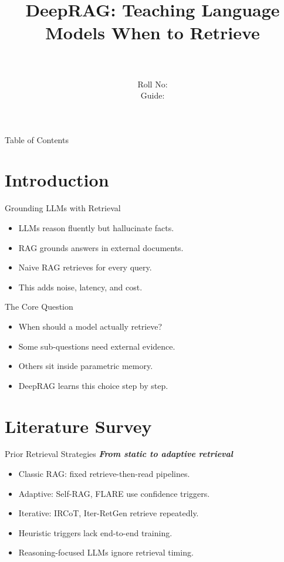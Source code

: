 \documentclass{beamer}
\title[\seminarShortTitle]{DeepRAG: Teaching Language Models When to Retrieve}
\author[\seminarName\ (\seminarShortCollege)]{\seminarName \\ \seminarRoll \\ Roll No: \seminarClassRoll \\ Guide: \seminarGuide}
\institute[\seminarShortCollege]{\seminarDept \\ \seminarCollege}
\date{\seminarDate}
\begin{document}
\begin{frame}\titlepage\end{frame}
\begin{frame}{Table of Contents}\tableofcontents\end{frame}
\section{Introduction}
\begin{frame}{Grounding LLMs with Retrieval}
\begin{itemize}
\item LLMs reason fluently but hallucinate facts.
\item RAG grounds answers in external documents.
\item Naive RAG retrieves for every query.
\item This adds noise, latency, and cost.
\end{itemize}
\end{frame}

\begin{frame}{The Core Question}
\begin{itemize}
\item When should a model actually retrieve?
\item Some sub-questions need external evidence.
\item Others sit inside parametric memory.
\item DeepRAG learns this choice step by step.
\end{itemize}
\end{frame}

\section{Literature Survey}
\begin{frame}{Prior Retrieval Strategies}
\textbf{\textit{From static to adaptive retrieval}}
\begin{itemize}
\item Classic RAG: fixed retrieve-then-read pipelines.
\item Adaptive: Self-RAG, FLARE use confidence triggers.
\item Iterative: IRCoT, Iter-RetGen retrieve repeatedly.
\item Heuristic triggers lack end-to-end training.
\item Reasoning-focused LLMs ignore retrieval timing.
\end{itemize}
\end{frame}
\end{document}
